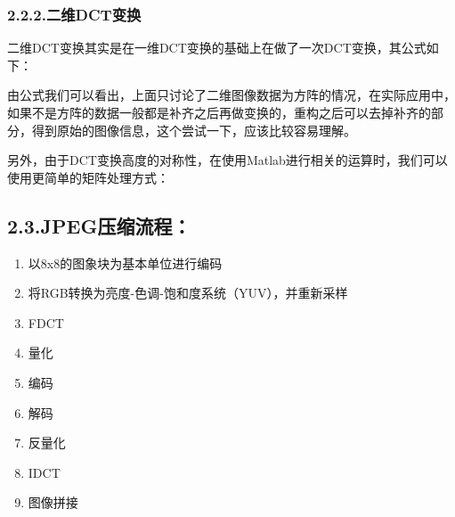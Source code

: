 \documentclass[a4paper, 12pt]{ctexart}
\begin{document}
\subsubsection{2.2.2.\hspace*{0.5em}二维DCT变换}\label{sec-dct}%

\noindent{}二维DCT变换其实是在一维DCT变换的基础上在做了一次DCT变换，其公式如下：%

       由公式我们可以看出，上面只讨论了二维图像数据为方阵的情况，在实际应用中，如果不是方阵的数据一般都是补齐之后再做变换的，重构之后可以去掉补齐的部分，得到原始的图像信息，这个尝试一下，应该比较容易理解。%

另外，由于DCT变换高度的对称性，在使用Matlab进行相关的运算时，我们可以使用更简单的矩阵处理方式：%


\subsection{2.3.\hspace*{0.5em}JPEG压缩流程：}\label{sec-jpeg}%

\begin{enumerate}[noitemsep,topsep=\mdcompacttopsep]%

\item{}以8x8的图象块为基本单位进行编码%

\item{}将RGB转换为亮度-色调-饱和度系统（YUV），并重新采样%

\item{}FDCT%

\item{}量化%

\item{}编码%

\item{}解码%

\item{}反量化%

\item{}IDCT%

\item{}图像拼接%
\end{enumerate}%
\end{document}
